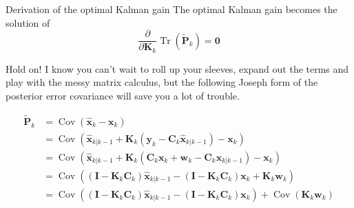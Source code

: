 \documentclass[utf-8, 10pt, aspectratio=1610]{beamer}
\begin{document}
\begin{frame}[allowframebreaks]{Derivation of the optimal Kalman gain}
	\framebreak
	The optimal Kalman gain becomes the solution of
	\begin{equation}
		\frac{\partial}{\partial \mathbf{K}_k} \operatorname{Tr} \left(\tilde{\mathbf{P}}_k\right) = \mathbf{0}
	\end{equation}

	Hold on! I know you can't wait to roll up your sleeves, expand out the terms and play with the messy matrix calculus, but the following \alert{Joseph form} of the posterior error covariance will save you a lot of trouble.

	\framebreak
	\begin{align}
		\tilde{\mathbf{P}}_k & = \operatorname{Cov}\left(\hat{\mathbf{x}}_k - \mathbf{x}_k \right)                                                                                                                                                                                                                                                                                           \\
		                     & = \operatorname{Cov}\left(\hat{\mathbf{x}}_{k\vert k-1} + \mathbf{K}_k \left(\mathbf{y}_k - \mathbf{C}_k \hat{\mathbf{x}}_{k\vert k-1}\right) - \mathbf{x}_k \right)                                                                                                                                                                                          \\
		                     & = \operatorname{Cov}\left(\hat{\mathbf{x}}_{k\vert k-1} + \mathbf{K}_k \left(\mathbf{C}_k \mathbf{x}_k + \mathbf{w}_k - \mathbf{C}_k \hat{\mathbf{x}}_{k\vert k-1}\right) - \mathbf{x}_k \right)                                                                                                                                                              \\
		                     & = \operatorname{Cov}\left( \left(\mathbf{I} - \mathbf{K}_k \mathbf{C}_k\right) \hat{\mathbf{x}}_{k \vert k-1} - \left( \mathbf{I} - \mathbf{K}_k \mathbf{C}_k \right) \mathbf{x}_k + \mathbf{K}_k \mathbf{w}_k \right)                                                                                                                                        \\
		                     & = \operatorname{Cov}\left( \left(\mathbf{I} - \mathbf{K}_k \mathbf{C}_k\right) \hat{\mathbf{x}}_{k \vert k-1} - \left( \mathbf{I} - \mathbf{K}_k \mathbf{C}_k \right) \mathbf{x}_k \right) + \operatorname{Cov} \left( \mathbf{K}_k \mathbf{w}_k \right)                                                                                                      \\

\end{align}
\end{frame}
\end{document}
